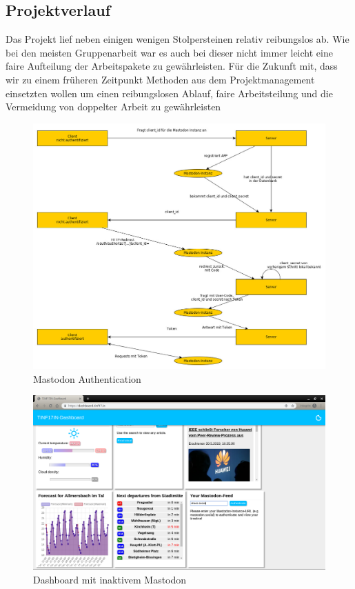 \documentclass[fleqn,10pt]{SelfArx} %
\begin{document}
\subsection{Projektverlauf}
Das Projekt lief neben einigen wenigen Stolpersteinen relativ reibungslos ab. Wie bei den meisten Gruppenarbeit war es auch bei dieser nicht immer leicht eine faire Aufteilung der Arbeitspakete zu gewährleisten. Für die Zukunft mit, dass wir zu einem früheren Zeitpunkt Methoden aus dem Projektmanagement einsetzten wollen um einen reibungslosen Ablauf, faire Arbeitsteilung und die Vermeidung von doppelter Arbeit zu gewährleisten 
\begin{figure}
\includegraphics[width=\linewidth]{mastodon.jpg}
\caption{Mastodon Authentication}
\label{fig:mastodon1}
\end{figure}
\begin{figure}
	\includegraphics[width=\linewidth]{images/1.png}
	\caption{Dashboard mit inaktivem Mastodon}
	\label{fig:demo1}
\end{figure}
\end{document}
